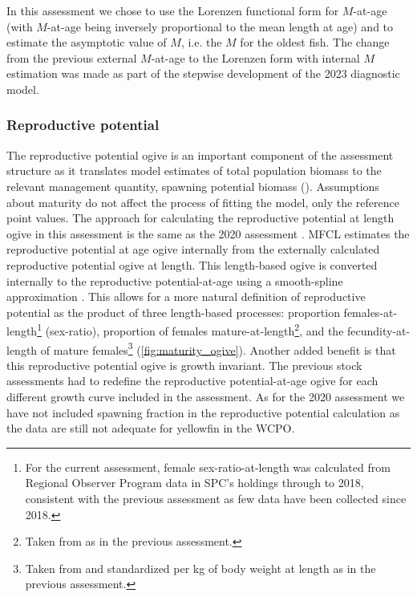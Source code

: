 In this assessment we chose to use the Lorenzen functional form for $M$-at-age (with $M$-at-age being inversely proportional to the mean length at age) and to estimate the asymptotic value of $M$, i.e. the $M$ for the oldest fish. The change from the previous external $M$-at-age to the Lorenzen form with internal $M$ estimation was made as part of the stepwise development of the 2023 diagnostic model.

\subsubsection{Reproductive potential}
\label{sec:model_reproductive_potential}

The reproductive potential ogive is an important component of the assessment structure as it translates model estimates of total population biomass to the relevant management quantity, spawning potential biomass (\sb). Assumptions about maturity do not affect the process of fitting the model, only the reference point values. The approach for calculating the reproductive potential at length ogive in this assessment is the same as the 2020 assessment \citep{vincent_stock_2020}. MFCL estimates the reproductive potential at age ogive internally from the externally calculated reproductive potential ogive at length. This length-based ogive is converted internally to the reproductive potential-at-age using a smooth-spline approximation \citep{davies_developments_2019}. This allows for a more natural definition of reproductive potential as the product of three length-based processes: proportion females-at-length\footnote{For the current assessment, female sex-ratio-at-length was calculated from Regional Observer Program data in SPC's holdings through to 2018, consistent with the previous assessment as few data have been collected since 2018.} (sex-ratio), proportion of females mature-at-length\footnote{Taken from \citet{farley_age_2017} as in the previous assessment.}, and the fecundity-at-length of mature females\footnote{Taken from \citet{sun_reproductive_2006} and standardized per kg of body weight at length as in the previous assessment.} (\autoref{fig:maturity_ogive}). Another added benefit is that this reproductive potential ogive is growth invariant. The previous stock assessments had to redefine the reproductive potential-at-age ogive for each different growth curve included in the assessment. As for the 2020 assessment we have not included spawning fraction in the reproductive potential calculation as the data are still not adequate for yellowfin in the WCPO.

